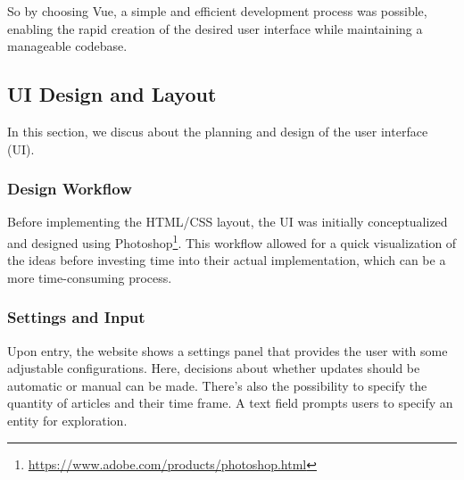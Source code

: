 \documentclass[a4paper,10pt]{report}
\begin{document}
So by choosing Vue, a simple and efficient development process was possible, enabling the rapid creation of the desired user interface while maintaining a manageable codebase.

\subsection{UI Design and Layout}
In this section, we discus about the planning and design of the user interface (UI).

\subsubsection{Design Workflow}
Before implementing the HTML/CSS layout, the UI was initially conceptualized and designed using Photoshop\footnote{\url{https://www.adobe.com/products/photoshop.html}}. This workflow allowed for a quick visualization of the ideas before investing time into their actual implementation, which can be a more time-consuming process. %


\subsubsection{Settings and Input}
Upon entry, the website shows a settings panel that provides the user with some adjustable configurations. Here, decisions about whether updates should be automatic or manual can be made. There’s also the possibility to specify the quantity of articles and their time frame. A text field prompts users to specify an entity for exploration.


\end{document}
